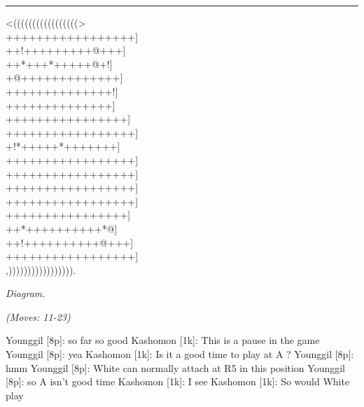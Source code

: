 \documentclass[letterpaper,12pt]{memoir}
\newcounter{GoFigure}[part]
\newcommand{\gofigure}{%
 \stepcounter{GoFigure}
 \centerline{\textit{Diagram.\thinspace\arabic{GoFigure}}}
}
\newcommand{\subtext}[1]{\centerline{\textit{#1}}}
\begin{document}
\rule{\textwidth}{0.5pt}

\begin{minipage}[t]{0.5\textwidth}
{\gnos
<(((((((((((((((((>\\
+++++++++++++++++]\\
++!+++++++++@+++]\\
++*+++*+++++@+!]\\
+@+++++++++++++]\\
++++++++++++++!]\\
++++++++++++++]\\
++++++++++++++++]\\
+++++++++++++++++]\\
+!*+++++*+++++++]\\
+++++++++++++++++]\\
+++++++++++++++++]\\
+++++++++++++++++]\\
+++++++++++++++++]\\
++++++++++++++++]\\
++*++++++++++*@]\\
++!++++++++++@+++]\\
+++++++++++++++++]\\
,))))))))))))))))).\\
}
\gofigure

\subtext{(Moves: 11-23)}
\end{minipage}
\begin{minipage}[t]{0.5\textwidth}
\setlength{\parskip}{0.5em}
Younggil [8p]: so far so good
Kashomon [1k]: This is a pause in the game
Younggil [8p]: yea
Kashomon [1k]: Is it a good time to play at A ? 
Younggil [8p]: hmm
Younggil [8p]: White can normally attach at R5 in this position
Younggil [8p]: so A isn't good time
Kashomon [1k]: I see
Kashomon [1k]: So would White play


\end{minipage}
\vfill
\end{document}
